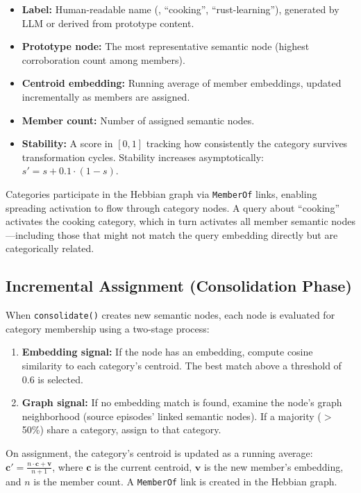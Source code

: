 \begin{itemize}[nosep]
    \item \textbf{Label:} Human-readable name (\eg, ``cooking'',
    ``rust-learning''), generated by LLM or derived from prototype content.
    \item \textbf{Prototype node:} The most representative semantic node
    (highest corroboration count among members).
    \item \textbf{Centroid embedding:} Running average of member embeddings,
    updated incrementally as members are assigned.
    \item \textbf{Member count:} Number of assigned semantic nodes.
    \item \textbf{Stability:} A score in $[0, 1]$ tracking how consistently
    the category survives transformation cycles. Stability increases
    asymptotically: $s' = s + 0.1 \cdot (1 - s)$.
\end{itemize}

Categories participate in the Hebbian graph via \texttt{MemberOf} links,
enabling spreading activation to flow through category nodes. A query about
``cooking'' activates the cooking category, which in turn activates all
member semantic nodes---including those that might not match the query
embedding directly but are categorically related.

\subsection{Incremental Assignment (Consolidation Phase)}

When \texttt{consolidate()} creates new semantic nodes, each node is
evaluated for category membership using a two-stage process:

\begin{enumerate}[nosep]
    \item \textbf{Embedding signal:} If the node has an embedding, compute
    cosine similarity to each category's centroid. The best match above a
    threshold of 0.6 is selected.
    \item \textbf{Graph signal:} If no embedding match is found, examine the
    node's graph neighborhood (source episodes' linked semantic nodes). If a
    majority ($>$50\%) share a category, assign to that category.
\end{enumerate}

On assignment, the category's centroid is updated as a running average:
$\mathbf{c}' = \frac{n \cdot \mathbf{c} + \mathbf{v}}{n + 1}$, where
$\mathbf{c}$ is the current centroid, $\mathbf{v}$ is the new member's
embedding, and $n$ is the member count. A \texttt{MemberOf} link is created
in the Hebbian graph.

